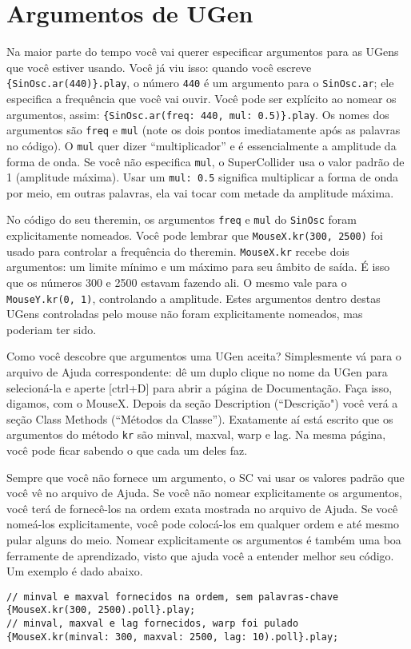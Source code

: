\section{Argumentos de UGen}

Na maior parte do tempo você vai querer especificar argumentos para as UGens que você estiver usando. Você já viu isso: quando você escreve \texttt{\{SinOsc.ar(440)\}.play}, o número \texttt{440} é um argumento para o \texttt{SinOsc.ar}; ele especifica a frequência que você vai ouvir. Você pode ser explícito ao nomear os argumentos, assim: \texttt{\{SinOsc.ar(freq: 440, mul: 0.5)\}.play}. Os nomes dos argumentos são \texttt{freq} e \texttt{mul} (note os dois pontos imediatamente após as palavras no código). O \texttt{mul} quer dizer “multiplicador” e é essencialmente a amplitude da forma de onda. Se você não especifica \texttt{mul}, o SuperCollider usa o valor padrão de 1 (amplitude máxima). Usar um \texttt{mul: 0.5} significa multiplicar a forma de onda por meio, em outras palavras, ela vai tocar com metade da amplitude máxima.

No código do seu theremin, os argumentos \texttt{freq} e \texttt{mul} do \texttt{SinOsc} foram explicitamente nomeados. Você pode lembrar que \texttt{MouseX.kr(300, 2500)} foi usado para controlar a frequência do theremin. \texttt{MouseX.kr} recebe dois argumentos: um limite mínimo e um máximo para seu âmbito de saída. É isso que os números 300 e 2500 estavam fazendo ali. O mesmo vale para o \texttt{MouseY.kr(0, 1)}, controlando a amplitude. Estes argumentos dentro destas UGens controladas pelo mouse não foram explicitamente nomeados, mas poderiam ter sido.

Como você descobre que argumentos uma UGen aceita? Simplesmente vá para o arquivo de Ajuda correspondente: dê um duplo clique no nome da UGen para selecioná-la e aperte [ctrl+D] para abrir a página de Documentação. Faça isso, digamos, com o MouseX. Depois da seção Description (“Descrição") você verá a seção Class Methods (“Métodos da Classe”). Exatamente aí está escrito que os argumentos do método \texttt{kr} são minval, maxval, warp e lag. Na mesma página, você pode ficar sabendo o que cada um deles faz.

Sempre que você não fornece um argumento, o SC vai usar os valores padrão que você vê no arquivo de Ajuda. Se você não nomear explicitamente os argumentos, você terá de fornecê-los na ordem exata mostrada no arquivo de Ajuda. Se você nomeá-los explicitamente, você pode colocá-los em qualquer ordem e até mesmo pular alguns do meio. Nomear explicitamente os argumentos é também uma boa ferramente de aprendizado, visto que ajuda você a entender melhor seu código. Um exemplo é dado abaixo.

\begin{lstlisting}[style=SuperCollider-IDE, basicstyle=\scttfamily\footnotesize]
// minval e maxval fornecidos na ordem, sem palavras-chave
{MouseX.kr(300, 2500).poll}.play;
// minval, maxval e lag fornecidos, warp foi pulado
{MouseX.kr(minval: 300, maxval: 2500, lag: 10).poll}.play;
\end{lstlisting}
